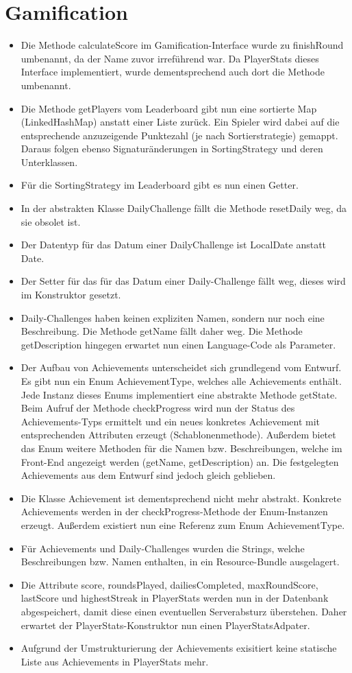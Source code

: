 \documentclass[a4paper]{scrreprt}
\begin{document}
\section{Gamification}
\begin{itemize}
  \item Die Methode calculateScore im Gamification-Interface wurde zu finishRound umbenannt, da der Name zuvor irreführend war. Da PlayerStats dieses Interface implementiert, wurde dementsprechend auch dort die Methode umbenannt.
  \item Die Methode getPlayers vom Leaderboard gibt nun eine sortierte Map (LinkedHashMap) anstatt einer Liste zurück. Ein Spieler wird dabei auf die entsprechende anzuzeigende Punktezahl (je nach Sortierstrategie) gemappt. Daraus folgen ebenso Signaturänderungen in SortingStrategy und deren Unterklassen.
  \item Für die SortingStrategy im Leaderboard gibt es nun einen Getter.
  \item In der abstrakten Klasse DailyChallenge fällt die Methode resetDaily weg, da sie obsolet ist.
  \item Der Datentyp für das Datum einer DailyChallenge ist LocalDate anstatt Date.
  \item Der Setter für das für das Datum einer Daily-Challenge fällt weg, dieses wird im Konstruktor gesetzt.
  \item Daily-Challenges haben keinen expliziten Namen, sondern nur noch eine Beschreibung. Die Methode getName fällt daher weg. Die Methode getDescription hingegen erwartet nun einen Language-Code als Parameter.
  \item Der Aufbau von Achievements unterscheidet sich grundlegend vom Entwurf. Es gibt nun ein Enum AchievementType, welches alle Achievements
    enthält. Jede Instanz dieses Enums implementiert eine abstrakte Methode getState. Beim Aufruf der Methode checkProgress
    wird nun der Status des Achievements-Typs ermittelt und ein neues konkretes Achievement mit entsprechenden Attributen
    erzeugt (Schablonenmethode). Außerdem bietet das Enum weitere Methoden für die Namen bzw. Beschreibungen, welche im Front-End
    angezeigt werden (getName, getDescription) an. Die festgelegten Achievements aus dem Entwurf sind jedoch gleich geblieben.
  \item Die Klasse Achievement ist dementsprechend nicht mehr abstrakt. Konkrete Achievements werden in der checkProgress-Methode
    der Enum-Instanzen erzeugt. Außerdem existiert nun eine Referenz zum Enum AchievementType.
  \item Für Achievements und Daily-Challenges wurden die Strings, welche Beschreibungen bzw. Namen enthalten, in ein Resource-Bundle ausgelagert.
  \item Die Attribute score, roundsPlayed, dailiesCompleted, maxRoundScore, lastScore und highestStreak in PlayerStats werden nun in der Datenbank abgespeichert, damit diese
    einen eventuellen Serverabsturz überstehen. Daher erwartet der PlayerStats-Konstruktor nun einen PlayerStatsAdpater.
  \item Aufgrund der Umstrukturierung der Achievements exisitiert keine statische Liste aus Achievements in PlayerStats mehr.
\end{itemize}
\end{document}
